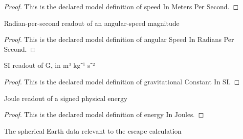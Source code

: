 \begin{proof}
  This is the declared model definition of speed In Meters Per Second.
\end{proof}
\begin{definition}
  \label{def:physics:phyx-mini-0714:phyxminiproblems-problemphyxmini0714-angularspeedinradianspersecond}
  Radian-per-second readout of an angular-speed magnitude
\end{definition}
\begin{proof}
  This is the declared model definition of angular Speed In Radians Per Second.
\end{proof}
\begin{definition}
  \label{def:physics:phyx-mini-0714:phyxminiproblems-problemphyxmini0714-gravitationalconstantinsi}
  SI readout of G, in m³ kg⁻¹ s⁻²
\end{definition}
\begin{proof}
  This is the declared model definition of gravitational Constant In SI.
\end{proof}
\begin{definition}
  \label{def:physics:phyx-mini-0714:phyxminiproblems-problemphyxmini0714-energyinjoules}
  Joule readout of a signed physical energy
\end{definition}
\begin{proof}
  This is the declared model definition of energy In Joules.
\end{proof}
\begin{definition}
  \label{def:physics:phyx-mini-0714:phyxminiproblems-problemphyxmini0714-earthmodel}
  The spherical Earth data relevant to the escape calculation
\end{definition}
